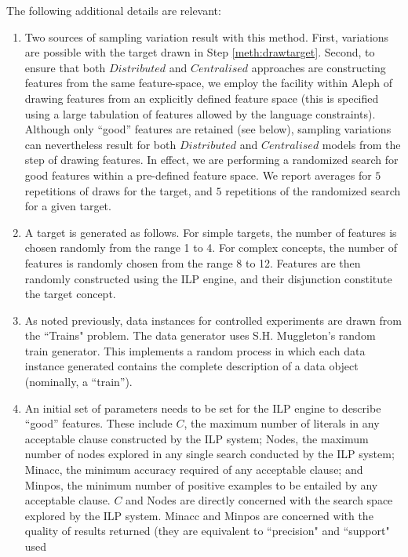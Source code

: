 \noindent
The following additional details are relevant:

\begin{enumerate}
\item Two sources of sampling variation result with this method. First, variations are possible with
        the target drawn in Step \ref{meth:drawtarget}. Second, to ensure that
        both $Distributed$ and $Centralised$ approaches are constructing features from the same feature-space,
        we employ the
        facility within Aleph of drawing features from an explicitly defined feature space (this
        is specified using a large tabulation of features allowed by the language constraints).
        Although only ``good'' features are retained (see below),
        sampling variations can nevertheless result for both $Distributed$ and $Centralised$ models
        from the step of drawing features. In effect, we are performing a randomized search for
        good features within a pre-defined feature space. We report averages for $5$ repetitions
        of draws for the target, and $5$ repetitions of the randomized search for a given target.
\item A target is generated as follows. For simple targets, the number of
    features is chosen randomly from the range 1 to 4. For complex concepts,
    the number of features is randomly chosen from the range 8 to 12. Features are
    then randomly constructed using the ILP engine, and their disjunction constitute the
    target concept.
\item As noted previously, data instances for controlled experiments are drawn
    from the ``Trains" problem. The data generator uses S.H. Muggleton's random
    train generator. This implements a random process in which each data instance
    generated contains the complete description of a data object (nominally, a ``train'').
\item An initial set of parameters needs to be set for the ILP engine to describe ``good''
    features.
    These include $C$, the maximum number of literals in any acceptable clause constructed by the
    ILP system; Nodes, the maximum number of nodes explored in any single search conducted by
    the ILP system; Minacc, the minimum accuracy required of any acceptable clause; and Minpos, the
    minimum number of positive examples to be entailed by any acceptable clause.
    $C$ and Nodes are directly concerned with the search space explored
    by the ILP system. Minacc and Minpos
    are concerned with the quality of results returned (they are equivalent to ``precision" and ``support" used

\end{enumerate}

